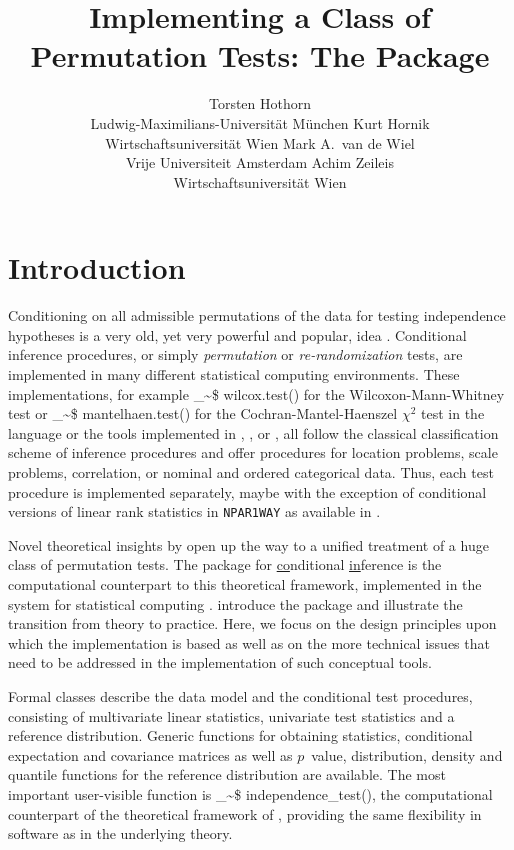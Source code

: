 \documentclass{Z}
\author{Torsten Hothorn \\ Ludwig-Maximilians-Universit\"at M\"unchen \And
        Kurt Hornik \\Wirtschaftsuniversit\"at Wien \AND
        Mark A.\ van de Wiel \\Vrije Universiteit Amsterdam \And
        Achim Zeileis\\Wirtschaftsuniversit\"at Wien}
\title{Implementing a Class of Permutation Tests: The \pkg{coin} Package}
\makeatletter
\newcommand\Rcmd{\bgroup\@makeother\_\@makeother\~\@makeother\$\@codez}
\def\@codez#1{{\normalfont\ttfamily\hyphenchar\font=-1 #1()}\egroup}
\makeatother
\begin{document}
\section{Introduction}

Conditioning on all admissible permutations of the data for testing 
independence hypotheses is a very old, yet very powerful and popular, 
idea \citep{fisher1935,Ernst2004}. Conditional
inference procedures, or simply \textit{permutation} or \textit{re-randomization}
tests, are implemented in 
many different statistical computing environments.
These implementations, for example 
\Rcmd{wilcox.test} for the Wilcoxon-Mann-Whitney test or
\Rcmd{mantelhaen.test} for the Cochran-Mantel-Haenszel $\chi^2$ test in the
 language or the tools implemented in  \citep{StatXact6}, 
 \citep{LogXact8}, or  \citep{Stata}
\citep[see][for an overview]{Oster2002,Oster2003},
all follow the classical classification scheme of inference procedures and
offer procedures for location problems, scale problems, correlation, 
or nominal and ordered categorical data. 
Thus, each test procedure is 
implemented separately, maybe with the exception of conditional 
versions of linear rank statistics \citep{theory-of-:-1999} in \texttt{NPAR1WAY}
as available in  \citep{SAS}.

Novel theoretical insights by \cite{StrasserWeber1999} open up the way
to a unified treatment of a huge class of permutation
tests. The  package for \underline{co}nditional \underline{in}ference
is the computational counterpart to this theoretical framework,
implemented in the  system for statistical computing \citep{rcore2007}.
\cite{Hothorn:2006:AmStat} introduce the package and illustrate the
transition from theory to practice. Here, we focus on the design principles upon which the
 implementation is based as well as on the more technical issues
that need to be addressed in the implementation of such conceptual
tools.

Formal  classes describe the data model and the conditional test procedures, 
consisting of multivariate linear statistics, univariate test statistics 
and a reference distribution. Generic functions for obtaining
statistics, conditional expectation and covariance matrices as well as 
$p$~value, distribution, density and quantile functions for the reference
distribution are available. 
The most important user-visible function is  \Rcmd{independence_test},
the computational counterpart of the theoretical framework of \cite{StrasserWeber1999},
providing the same flexibility in software as in the
underlying theory. 
\end{document}
